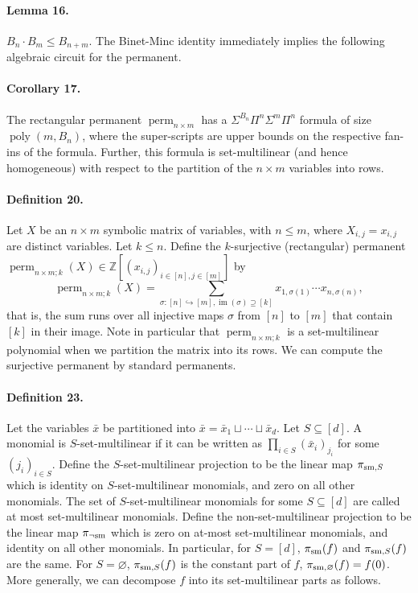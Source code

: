 \documentclass[10pt,a4paper]{article}
\begin{document}
\paragraph{Lemma 16.} $B_n\cdot B_m\le B_{n+m}$.
The Binet-Minc identity immediately implies the following algebraic circuit for the permanent.
\paragraph{Corollary 17.} The rectangular permanent $\operatorname{perm}_{n\times m}$ has a $\Sigma^{B_n}\Pi^n\Sigma^m\Pi^n$ formula of size $\operatorname{poly}(m,B_n)$, where the super-scripts are upper bounds on the respective fan-ins of the formula. Further, this formula is set-multilinear (and hence homogeneous) with respect to the partition of the $n\times m$ variables into rows.
\paragraph{Definition 20.} Let $X$ be an $n\times m$ symbolic matrix of variables, with $n\le m$, where $X_{i,j}=x_{i,j}$ are distinct variables. Let $k\le n$. Define the $k$-surjective (rectangular) permanent $\operatorname{perm}_{n\times m;k}(X)\in\mathbb Z[(x_{i,j})_{i\in[n],j\in[m]}]$ by
\[\operatorname{perm}_{n\times m;k}(X)=\sum_{\sigma:[n]\hookrightarrow[m],\operatorname{im}(\sigma)\supseteq[k]}x_{1,\sigma(1)}\cdots x_{n,\sigma(n)},\]
that is, the sum runs over all injective maps $\sigma$ from $[n]$ to $[m]$ that contain $[k]$ in their image.
Note in particular that $\operatorname{perm}_{n\times m;k}$ is a set-multilinear polynomial when we partition the matrix into its rows.
We can compute the surjective permanent by standard permanents.
\paragraph{Definition 23.} Let the variables $\bar x$ be partitioned into $\bar x=\bar x_1\sqcup\cdots\sqcup\bar x_d$.
Let $S\subseteq[d]$. A monomial is $S$-set-multilinear if it can be written as $\prod_{i\in S}(\bar x_i)_{j_i}$ for some $(j_i)_{i\in S}$. Define the $S$-set-multilinear projection to be the linear map $\pi_{{\rm sm},S}$ which is identity on $S$-set-multilinear monomials, and zero on all other monomials.
The set of $S$-set-multilinear monomials for some $S\subseteq[d]$ are called at most set-multilinear monomials. Define the non-set-multilinear projection to be the linear map $\pi_{\neg{\rm sm}}$ which is zero on at-most set-multilinear monomials, and identity on all other monomials.
In particular, for $S=[d]$, $\pi_{\rm sm}(f)$ and $\pi_{{\rm sm},S}(f)$ are the same. For $S=\varnothing$, $\pi_{{\rm sm},S}(f)$ is the constant part of $f$, $\pi_{{\rm sm},\varnothing}(f)=f(0)$. More generally, we can decompose $f$ into its set-multilinear parts as follows.
\end{document}
